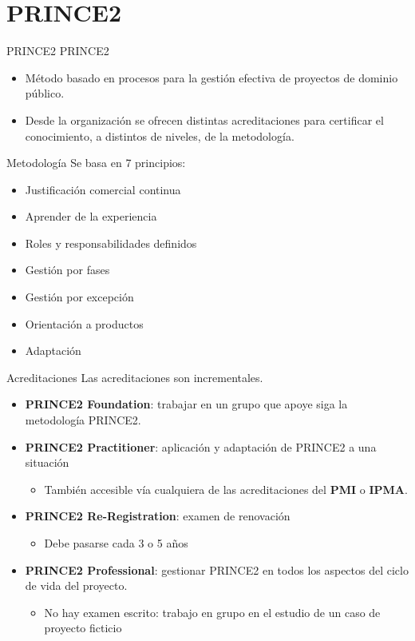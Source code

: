 \section{PRINCE2}
\begin{frame}[allowframebreaks]{PRINCE2}
	PRINCE2 
	\begin{itemize}
		\item Método basado en procesos para la gestión efectiva de proyectos de dominio público.
		\item Desde la organización se ofrecen distintas acreditaciones para certificar el conocimiento, a distintos de niveles, de la metodología.
	\end{itemize}
	
	\framebreak
	
	\begin{block}{Metodología}
		Se basa en 7 principios:
		\begin{itemize}
			\item Justificación comercial continua
			\item Aprender de la experiencia
			\item Roles y responsabilidades definidos
			\item Gestión por fases
			\item Gestión por excepción
			\item Orientación a productos
			\item Adaptación
		\end{itemize}
	\end{block}
	
	\framebreak
	
	\begin{block}{Acreditaciones}
		Las acreditaciones son incrementales.
		\begin{itemize}
			\item \textbf{PRINCE2 Foundation}: trabajar en un grupo que apoye siga la metodología PRINCE2.
			\item \textbf{PRINCE2 Practitioner}: aplicación y adaptación de PRINCE2 a una situación
			\begin{itemize}
				\item También accesible vía cualquiera de las acreditaciones del \textbf{PMI} o \textbf{IPMA}.
			\end{itemize}
			\item \textbf{PRINCE2 Re-Registration}: examen de renovación
			\begin{itemize}
				\item Debe pasarse cada 3 o 5 años
			\end{itemize}
			\item \textbf{PRINCE2 Professional}: gestionar PRINCE2 en todos los aspectos del ciclo de vida del proyecto.
			\begin{itemize}
				\item No hay examen escrito: trabajo en grupo en el estudio de un caso de proyecto ficticio
			\end{itemize}
		\end{itemize}
	\end{block}
\end{frame}